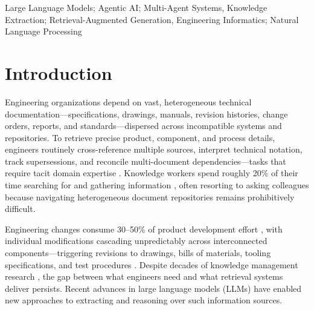 \documentclass[largeformat]{interact}
\begin{document}
\begin{keywords}
Large Language Models; Agentic AI; Multi-Agent Systems, Knowledge Extraction; Retrieval-Augmented Generation, Engineering Informatics; Natural Language Processing 
\end{keywords}

\section{Introduction}
\label{sec:Introduction}
Engineering organizations depend on vast, heterogeneous technical documentation—specifications, drawings, manuals, revision histories, change orders, reports, and standards—dispersed across incompatible systems and repositories. To retrieve precise product, component, and process details, engineers routinely cross-reference multiple sources, interpret technical notation, track supersessions, and reconcile multi-document dependencies—tasks that require tacit domain expertise \cite{hertzum2000information}. Knowledge workers spend roughly 20\% of their time searching for and gathering information \cite{court1997supporting, mckinsey2012social}, often resorting to asking colleagues because navigating heterogeneous document repositories remains prohibitively difficult.

Engineering changes consume 30–50\% of product development effort \cite{fricke2000coping}, with individual modifications cascading unpredictably across interconnected components—triggering revisions to drawings, bills of materials, tooling specifications, and test procedures \cite{clarkson2004predicting}. Despite decades of knowledge management research \cite{mcmahon2004knowledge, heisig2010exploring}, the gap between what engineers need and what retrieval systems deliver persists. Recent advances in large language models (LLMs) have enabled new approaches to extracting and reasoning over such information sources.
\end{document}
